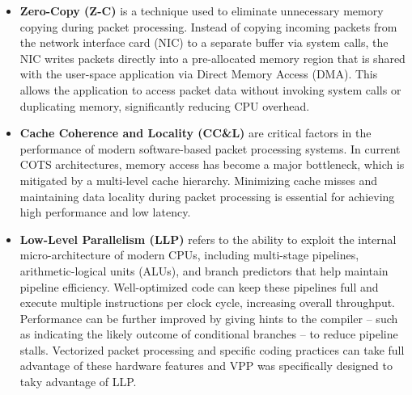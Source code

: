 \begin{itemize}
  \item \textbf{Zero-Copy (Z-C)} 
is a technique used to eliminate unnecessary memory copying during packet processing. 
Instead of copying incoming packets from the network interface card (NIC) to a separate buffer via system calls, 
the NIC writes packets directly into a pre-allocated memory region that is shared with the user-space application via Direct Memory Access (DMA). 
This allows the application to access packet data without invoking system calls or duplicating memory, significantly reducing CPU overhead. 

  \item \textbf {Cache Coherence and Locality (CC\&L)} are critical factors in the performance of modern software-based packet processing systems. 
In current COTS architectures, memory access has become a major bottleneck, which is mitigated by a multi-level cache hierarchy.
Minimizing cache misses and maintaining data locality during packet processing is essential for achieving high performance and low latency.

  \item \textbf {Low-Level Parallelism (LLP)} 
refers to the ability to exploit the internal micro-architecture of modern CPUs, including multi-stage pipelines, arithmetic-logical units (ALUs), and branch predictors that help maintain pipeline efficiency. 
Well-optimized code can keep these pipelines full and execute multiple instructions per clock cycle, increasing overall throughput. 
Performance can be further improved by giving hints to the compiler -- such as indicating the likely outcome of conditional branches -- to reduce pipeline stalls. 
Vectorized packet processing and specific coding practices can take full advantage of these hardware features and VPP was specifically designed to taky advantage of LLP.

\end{itemize}





